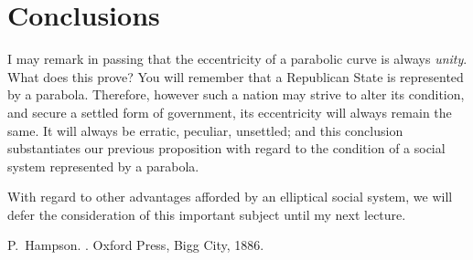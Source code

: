 \documentclass{jocg}
\begin{document}
\section{Conclusions}

I may remark in passing that the eccentricity of a parabolic curve is
always \emph{unity}. What does this prove? You will remember that a
Republican State is represented by a parabola. Therefore, however such
a nation may strive to alter its condition, and secure a settled form of
government, its eccentricity will always remain the same. It will always
be erratic, peculiar, unsettled; and this conclusion substantiates our
previous proposition with regard to the condition of a social system
represented by a parabola.

With regard to other advantages afforded by an elliptical social system,
we will defer the consideration of this important subject until my
next lecture.

%
%

\begin{thebibliography}{1}

P.~Hampson.
.
\newblock Oxford Press, Bigg City, 1886.

\end{thebibliography}
\end{document}
